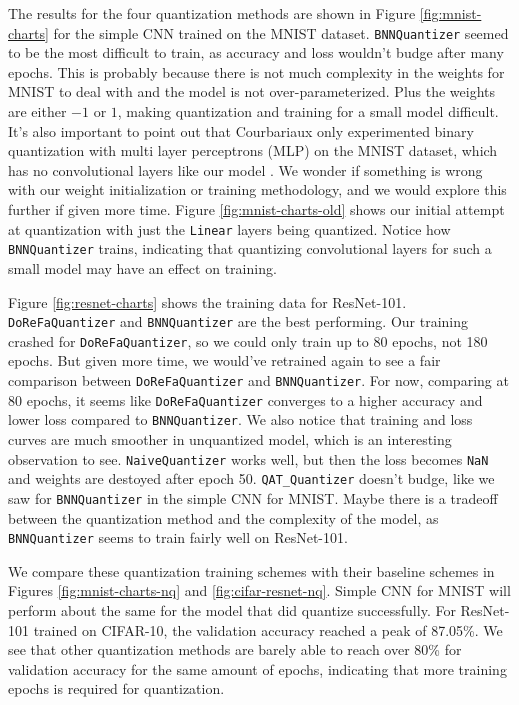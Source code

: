 \documentclass{article}
\begin{document}
The results for the four quantization methods are shown in Figure \ref{fig:mnist-charts} for the simple CNN trained on the MNIST dataset. \verb|BNNQuantizer| seemed to be the most difficult to train, as accuracy and loss wouldn't budge after many epochs. This is probably because there is not much complexity in the weights for MNIST to deal with and the model is not over-parameterized. Plus the weights are either $-1$ or $1$, making quantization and training for a small model difficult. It's also important to point out that Courbariaux only experimented binary quantization with multi layer perceptrons (MLP) on the MNIST dataset, which has no convolutional layers like our model \cite{binarynn}. We wonder if something is wrong with our weight initialization or training methodology, and we would explore this further if given more time. Figure \ref{fig:mnist-charts-old} shows our initial attempt at quantization with just the \verb|Linear| layers being quantized. Notice how  \verb|BNNQuantizer| trains, indicating that quantizing convolutional layers for such a small model may have an effect on training.

Figure \ref{fig:resnet-charts} shows the training data for ResNet-101. \verb|DoReFaQuantizer| and \verb|BNNQuantizer| are the best performing. Our training crashed for \verb|DoReFaQuantizer|, so we could only train up to 80 epochs, not 180 epochs. But given more time, we would've retrained again to see a fair comparison between \verb|DoReFaQuantizer| and \verb|BNNQuantizer|. For now, comparing at 80 epochs, it seems like \verb|DoReFaQuantizer| converges to a higher accuracy and lower loss compared to  \verb|BNNQuantizer|. We also notice that training and loss curves are much smoother in unquantized model, which is an interesting observation to see. \verb|NaiveQuantizer| works well, but then the loss becomes \verb|NaN| and weights are destoyed after epoch 50. \verb|QAT_Quantizer| doesn't budge, like we saw for \verb|BNNQuantizer| in the simple CNN for MNIST. Maybe there is a tradeoff between the quantization method and the complexity of the model, as \verb|BNNQuantizer| seems to train fairly well on ResNet-101.

We compare these quantization training schemes with their baseline schemes in Figures \ref{fig:mnist-charts-nq} and \ref{fig:cifar-resnet-nq}. Simple CNN for MNIST will perform about the same for the model that did quantize successfully. For ResNet-101 trained on CIFAR-10, the validation accuracy reached a peak of 87.05\%. We see that other quantization methods are barely able to reach over 80\% for validation accuracy for the same amount of epochs, indicating that more training epochs is required for quantization.
\end{document}
